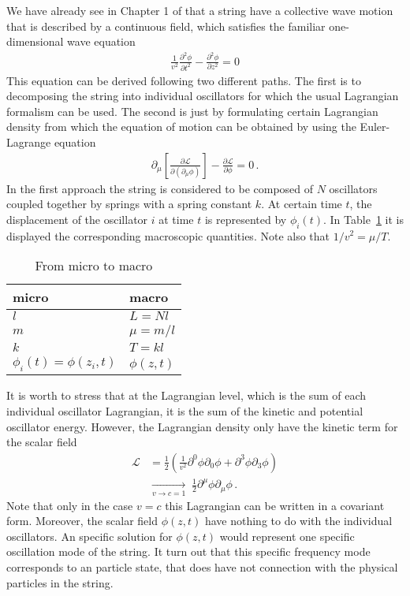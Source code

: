 \begin{frame}
We have already see in Chapter 1 of \cite{lsm} that a string have a collective wave motion that is described by a continuous field, which satisfies the familiar one-dimensional wave equation
\begin{align}
\label{eq:2}
  \frac{1}{v^2}\frac{\partial^2\phi}{\partial t^2}-\frac{\partial^2\phi}{\partial z^2}=0
\end{align}
This equation can be derived following two different paths. The first is to decomposing the string into individual oscillators for which the usual Lagrangian formalism can be used. The second is just by formulating certain Lagrangian density from which the equation of motion can be obtained  by using the Euler-Lagrange equation
\begin{align}
  \partial_\mu\left[\frac{\partial\mathcal{L}}{\partial(\partial_\mu\phi)}\right]-\frac{\partial\mathcal{L}}{\partial\phi}=0\,.
\end{align}
In the first approach the string is considered to be composed of $N$ oscillators coupled together  by springs with a spring constant $k$. At certain time $t$, the displacement of the oscillator $i$ at time $t$ is represented by $\phi_i(t)$. In Table~\ref{tab:1} it is displayed the corresponding macroscopic quantities. Note also that $1/v^2=\mu/T$.
\begin{table}[htp!]
  \centering
  \begin{tabular}{l|l}
    micro & macro \\\hline{}
    $l$ & $L=N l$\\
    $m$ & $\mu=m/l$ \\
    $k$ & $T=k l$\\
    $\phi_i(t)=\phi(z_i,t)$ &  $\phi(z,t)$\\
  \end{tabular}
  \caption{From micro to macro}
\label{tab:1}
\end{table}
It is worth to stress that at the Lagrangian level, which is the sum of each individual oscillator Lagrangian, it is the sum of the kinetic and potential oscillator energy. However, the Lagrangian density only have the kinetic term for the scalar field
\begin{align}
  \mathcal{L}&=\frac{1}{2}\left(\frac{1}{v^2}\partial^0\phi\partial_0\phi+\partial^3\phi\partial_3\phi\right)\nonumber\\
  &\underset{v\to c=1}{\longrightarrow}\;\tfrac{1}{2}\partial^\mu\phi\partial_\mu\phi\,.
\end{align}
Note that only in the case $v=c$ this Lagrangian can be written in a covariant form. Moreover, the scalar field $\phi(z,t)$ have nothing to do with the individual oscillators. An specific solution for $\phi(z,t)$ would represent one specific oscillation mode of the string. It turn out that  this specific frequency mode corresponds to an particle state, that does have not connection with the physical particles in the string. 


\end{frame}
